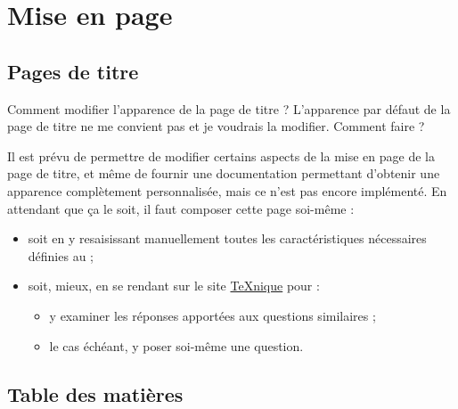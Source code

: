 

\section{Mise en page}
\label{sec-mise-en-page}

\subsection{Pages de titre}
\label{sec-pages-de-titre}
%
%

\begin{dbfaq}{Comment modifier l'apparence de la page de titre ?}{}
  L'apparence par défaut de la page de titre ne me convient pas et je voudrais
  la modifier. Comment faire ?
\end{dbfaq}

Il est prévu de permettre de modifier certains aspects de la mise en page de la
page de titre, et même de fournir une documentation permettant d'obtenir une
apparence complètement personnalisée, mais ce n'est pas encore implémenté.  En
attendant que ça le soit, il faut composer cette page soi-même :
\begin{itemize}
\item soit en y resaisissant manuellement toutes les caractéristiques
  nécessaires définies au  ;
\item soit, mieux, en se rendant sur le site
  \href{https://texnique.fr/osqa/tags/yathesis/}{\TeX{}nique} pour :
  \begin{itemize}
  \item y examiner les réponses apportées aux questions similaires ;
  \item le cas échéant, y poser soi-même une question.
  \end{itemize}
\end{itemize}

\subsection{Table des matières}
\label{sec-table-des-matieres-faq}

